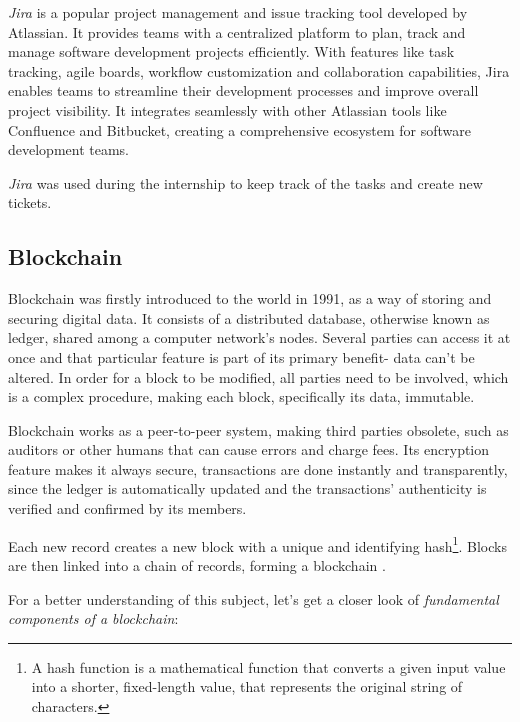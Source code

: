 \textit{Jira} is a popular project management and issue tracking tool developed by Atlassian. It provides teams with a centralized platform to plan, track and manage software development projects efficiently. With features like task tracking, agile boards, workflow customization and collaboration capabilities, Jira enables teams to streamline their development processes and improve overall project visibility. It integrates seamlessly with other Atlassian tools like Confluence and Bitbucket, creating a comprehensive ecosystem for software development teams.\newline

\textit{Jira} was used during the internship to keep track of the tasks and create new tickets.

\subsection{Blockchain} \label{blockchain}

Blockchain was firstly introduced to the world in 1991, as a way of storing and securing digital data. It consists of a distributed database, otherwise known as ledger, shared among a computer network's nodes. Several parties can access it at once and that particular feature is part of its primary benefit- data can't be altered. In order for a block to be modified, all parties need to be involved, which is a complex procedure, making each block, specifically its data, immutable.\newline

Blockchain works as a peer-to-peer system, making third parties obsolete, such as auditors or other humans that can cause errors and charge fees. Its encryption feature makes it always secure, transactions are done instantly and transparently, since the ledger is automatically updated and the transactions' authenticity is verified and confirmed by its members. \newline

Each new record creates a new block with a unique and identifying hash\footnote{A hash function is a mathematical function that converts a given input value into a shorter, fixed-length value, that represents the original string of characters.}. Blocks are then linked into a chain of records, forming a blockchain \cite{bc}. \newline

For a better understanding of this subject, let's get a closer look of \textit{fundamental components of a blockchain}: \newline


